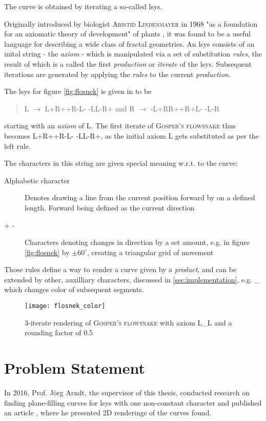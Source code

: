 The curve is obtained by iterating a so-called \gls{lsys}.

Originally introduced by biologist \textsc{Aristid Lindenmayer} in 1968 "as a foundation for an axiomatic theory of development" of plants \citep[Preface]{Prusinkiewicz2013}, it was found to be a useful language for describing a wide class of fractal geometries.
An \gls{lsys} consists of an inital string - the \textit{\gls{axiom}} - which is manipulated via a set of substitution \textit{rules}, the result of which is a called the first \textit{production} or \textit{iterate} of the \gls{lsys}. Subsequent iterations are generated by applying the \textit{rules} to the current \textit{production}.

The \gls{lsys} for figure \ref{fig:flosnek} is given in \citet[p.7]{Arndt2016} to be 
\begin{quote}
	\centering
	L $\rightarrow$ L+R++R-L- -LL-R+ \quad and \quad R $\rightarrow$ -L+RR++R+L- -L-R
\end{quote}
starting with an \textit{\gls{axiom}} of L. The first iterate of \textsc{Gosper's flowsnake} thus becomes L+R++R-L- -LL-R+, as the initial \gls{axiom} L gets substituted as per the left rule. 

The characters in this string are given special meaning w.r.t. to the curve:
\begin{description}
	\item[Alphabetic character] Denotes drawing a line from the current position forward by on a defined length. Forward being defined as the current direction
	\item[+ -] Characters denoting changes in direction by a set amount, e.g. in figure \ref{fig:flosnek} by $\pm60^\circ$, creating a triangular grid of movement
\end{description}

Those rules define a way to render a curve given by a \textit{\gls{product}}, and can be extended by other, auxilliary characters, discussed in \ref{sec:implementation}, e.g. \_ which changes color of subsequent segments.

\begin{figure}[hb]
	\centering
	\texttt{[image: flosnek\_color]}
	\caption{3-iterate rendering of \textsc{Gosper's flowsnake} with axiom \textrm{L\_L} and a rounding factor of 0.5}
\end{figure}

\section{Problem Statement}
In 2016, Prof. Jörg Arndt, the supervisor of this thesis, conducted research on finding plane-filling curves for \gls{lsys} with one non-constant character and published an article \citep{Arndt2016}, where he presented 2D renderings of the curves found.

